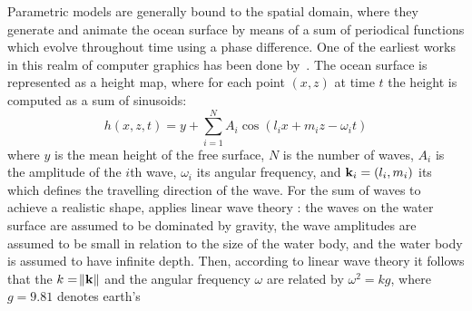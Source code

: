 %
%
Parametric models are generally bound to the spatial domain, where they
generate and animate the ocean surface by means of a sum of periodical functions
which evolve throughout time using a phase difference. One of the earliest works
in this realm of computer graphics has been done by~\citet{Max:1981}. The ocean
surface is represented as a height map, where for each point $(x,z)$ at time $t$
the height is computed as a sum of sinusoids:
\begin{equation}
h(x,z,t) = y + \sum_{i=1}^N A_i \cos (l_i x + m_i z - \omega_i t)
\end{equation}
where $y$ is the mean height of the free surface, $N$ is the number of waves,
$A_i$ is the amplitude of the $i$th wave, $\omega_i$ its angular frequency,
and $\mathbf{k}_i = (l_i, m_i)$ its \wavevector which defines the
travelling direction of the wave. For the sum of waves to achieve a
realistic shape, \citeauthor{Max:1981} applies linear wave theory \citep{book:airy1845tides}:
the waves on the water surface are assumed to be dominated by gravity, the wave
amplitudes are assumed to be small in relation to the size of the water body,
and the water body is assumed to have infinite depth. Then, according to linear
wave theory it follows that the \wavenumber $k=\norm{\mathbf{k}}$ and the angular
frequency $\omega$ are related by $\omega^2=kg$, where $g=9.81$ denotes earth's
